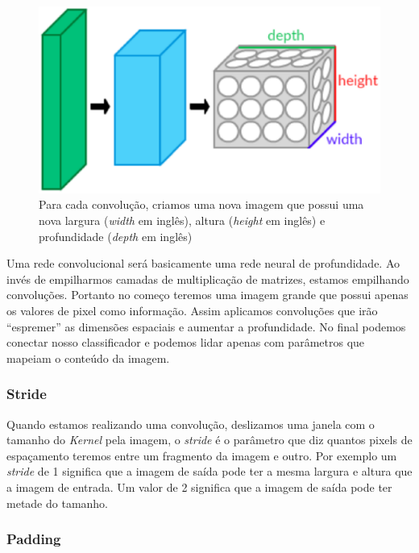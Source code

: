 \begin{figure}[H]
\centering
\includegraphics[scale=0.6]{imagens/Conv_layers.eps}
\caption{Para cada convolução, criamos uma nova imagem que possui uma
  nova largura (\textit{width} em inglês), altura (\textit{height} em
  inglês) e profundidade (\textit{depth} em inglês)}
\label{fig:convolution_kernel}
\end{figure}

Uma rede convolucional será basicamente uma rede neural de
profundidade. Ao invés de empilharmos camadas de multiplicação de
matrizes, estamos empilhando convoluções. Portanto no começo teremos
uma imagem grande que possui apenas os valores de pixel como
informação. Assim aplicamos convoluções que irão ``espremer'' as
dimensões espaciais e aumentar a profundidade. No final podemos
conectar nosso classificador e podemos lidar apenas com parâmetros que
mapeiam o conteúdo da imagem.\cite{Dumoulin2016}

\subsubsection{Stride}

Quando estamos realizando uma convolução, deslizamos uma janela com o
tamanho do \textit{Kernel} pela imagem, o \textit{stride} é o
parâmetro que diz quantos pixels de espaçamento teremos entre um
fragmento da imagem e outro. Por exemplo um \textit{stride} de 1
significa que a imagem de saída pode ter a mesma largura e altura que
a imagem de entrada. Um valor de 2 significa que a imagem de saída
pode ter metade do tamanho.

\subsubsection{Padding}

